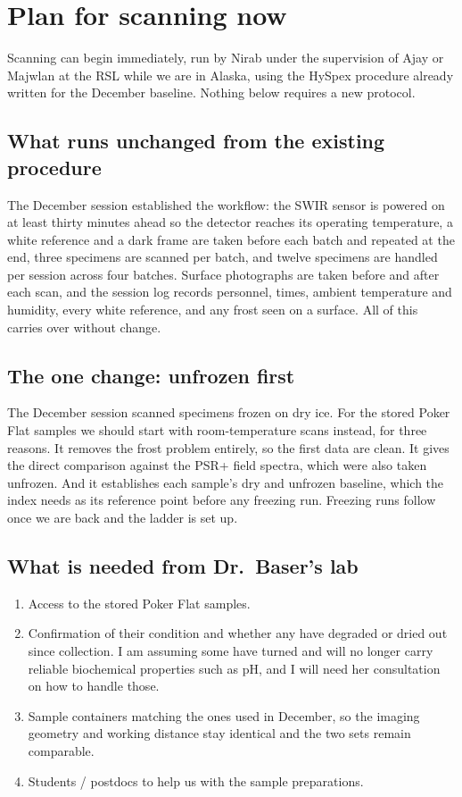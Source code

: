 \documentclass[11pt]{article}
\begin{document}
\section{Plan for scanning now}

Scanning can begin immediately, run by Nirab under the supervision of Ajay or
Majwlan at the RSL while we are in Alaska, using the HySpex procedure already
written for the December baseline. Nothing below requires a new protocol.

\subsection{What runs unchanged from the existing procedure}

The December session established the workflow: the SWIR sensor is powered on at
least thirty minutes ahead so the detector reaches its operating temperature, a
white reference and a dark frame are taken before each batch and repeated at the
end, three specimens are scanned per batch, and twelve specimens are handled per
session across four batches. Surface photographs are taken before and after each
scan, and the session log records personnel, times, ambient temperature and
humidity, every white reference, and any frost seen on a surface. All of this
carries over without change.

\subsection{The one change: unfrozen first}

The December session scanned specimens frozen on dry ice. For the stored Poker
Flat samples we should start with room-temperature scans instead, for three
reasons. It removes the frost problem entirely, so the first data are clean. It
gives the direct comparison against the PSR+ field spectra, which were also
taken unfrozen. And it establishes each sample's dry and unfrozen baseline,
which the index needs as its reference point before any freezing run. Freezing
runs follow once we are back and the ladder is set up.

\subsection{What is needed from Dr.\ Baser's lab}

\begin{enumerate}\itemsep2pt
\item Access to the stored Poker Flat samples.
\item Confirmation of their condition and whether any have degraded or dried out
      since collection. I am assuming some have turned and will no longer carry
      reliable biochemical properties such as pH, and I will need her
      consultation on how to handle those.
\item Sample containers matching the ones used in December, so the imaging
      geometry and working distance stay identical and the two sets remain
      comparable.
\item Students / postdocs to help us with the sample preparations.
\end{enumerate}
\end{document}
